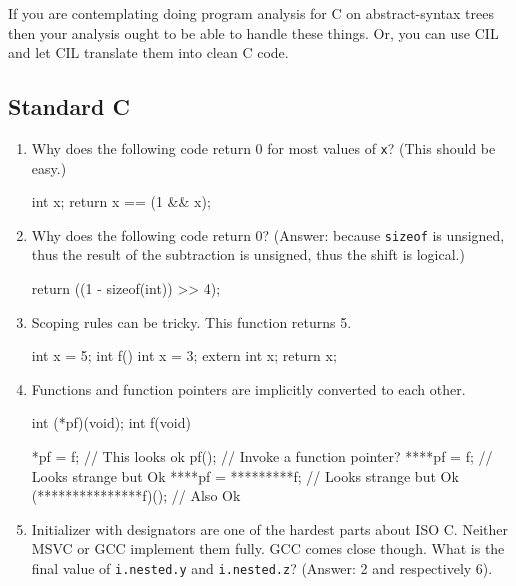 \documentclass{article}
\def\t#1{{\tt #1}}
\begin{document}
 If you are contemplating doing program analysis for C on abstract-syntax
trees then your analysis ought to be able to handle these things. Or, you can
use CIL and let CIL translate them into clean C code. 

%
%
%
 \subsection{Standard C}

\begin{enumerate}

\item Why does the following code return 0 for most values of \t{x}? (This
should be easy.)

\begin{cilcode}[local]
  int x;
  return x == (1 && x);
\end{cilcode}

\item Why does the following code return 0? (Answer: because \t{sizeof} is
unsigned, thus the result of the subtraction is unsigned, thus the shift is logical.)

\begin{cilcode}[local]
 return ((1 - sizeof(int)) >> 4);
\end{cilcode}

\item Scoping rules can be tricky. This function returns 5.

\begin{cilcode}[global]
int x = 5;
int f() {
  int x = 3;
  {
    extern int x;
    return x;
  }
}
\end{cilcode}

\item Functions and function pointers are implicitly converted to each other. 

\begin{cilcode}[global]
int (*pf)(void);
int f(void) {

   *pf = f; // This looks ok
   pf(); // Invoke a function pointer?     
   ****pf = f; // Looks strange but Ok
   ****pf = *********f; // Looks strange but Ok
   (***************f)(); // Also Ok             
}
\end{cilcode}

\item Initializer with designators are one of the hardest parts about ISO C.
Neither MSVC or GCC implement them fully. GCC comes close though. What is the
final value of \t{i.nested.y} and \t{i.nested.z}? (Answer: 2 and respectively
6). 


\end{enumerate}
\end{document}
